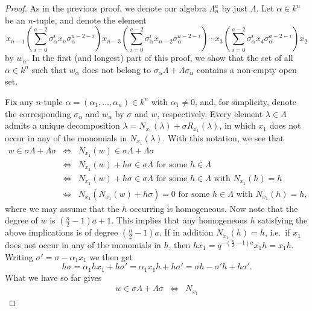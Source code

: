 \documentclass[a4paper]{amsart}
\theoremstyle{definition}
\theoremstyle{definition}
\theoremstyle{definition}
\theoremstyle{definition}
\theoremstyle{definition}
\theoremstyle{definition}
\theoremstyle{remark}
\theoremstyle{remark}
\theoremstyle{definition}
\theoremstyle{definition}
\begin{document}
\begin{proof}
As in the previous proof, we denote our algebra $\Lambda_n^a$ by
just $\Lambda$. Let $\alpha \in k^n$ be an $n$-tuple, and denote the
element
$$x_{n-1} \left ( \sum_{i=0}^{a-2} \sigma_{\alpha}^i x_n \sigma_{\alpha}^{a-2-i}
\right ) x_{n-3} \left ( \sum_{i=0}^{a-2} \sigma_{\alpha}^i x_{n-2}
\sigma_{\alpha}^{a-2-i} \right ) \cdots x_3 \left ( \sum_{i=0}^{a-2}
\sigma_{\alpha}^i x_4 \sigma_{\alpha}^{a-2-i} \right ) x_2$$ by
$w_{\alpha}$. In the first (and longest) part of this proof, we show
that the set of all $\alpha \in k^n$ such that $w_{\alpha}$ does not
belong to $\sigma_{\alpha} \Lambda + \Lambda \sigma_{\alpha}$
contains a non-empty open set.

Fix any $n$-tuple $\alpha = ( \alpha_1, \dots, \alpha_n ) \in k^n$
with $\alpha_1 \neq 0$, and, for simplicity, denote the
corresponding $\sigma_{\alpha}$ and $w_{\alpha}$ by $\sigma$ and
$w$, respectively. Every element $\lambda \in \Lambda$ admits a
unique decomposition $\lambda = N_{x_1}( \lambda ) + \sigma R_{x_1}
( \lambda )$, in which $x_1$ does not occur in any of the monomials
in $N_{x_1}( \lambda )$. With this notation, we see that
\begin{eqnarray*}
w \in \sigma \Lambda + \Lambda \sigma & \Leftrightarrow &
N_{x_1}(w) \in \sigma \Lambda + \Lambda \sigma \\
& \Leftrightarrow & N_{x_1}(w) + h \sigma \in \sigma \Lambda
\text{ for some } h \in \Lambda \\
& \Leftrightarrow & N_{x_1}(w) + h \sigma \in \sigma \Lambda
\text{ for some } h \in \Lambda \text{ with } N_{x_1}(h)=h \\
& \Leftrightarrow & N_{x_1} \left ( N_{x_1}(w) + h \sigma \right )
=0 \text{ for some } h \in \Lambda \text{ with } N_{x_1}(h)=h,
\end{eqnarray*}
where we may assume that the $h$ occurring is homogeneous. Now note
that the degree of $w$ is $\left ( \frac{n}{2} - 1 \right ) a+1$.
This implies that any homogeneous $h$ satisfying the above
implications is of degree $\left ( \frac{n}{2} - 1 \right ) a$. If
in addition $N_{x_1}(h)=h$, i.e.\ if $x_1$ does not occur in any of
the monomials in $h$, then $hx_1 = q^{- \left ( \frac{n}{2} - 1
\right ) a}x_1h = x_1h$. Writing $\sigma' = \sigma - \alpha_1 x_1$
we then get
$$h \sigma = \alpha_1hx_1 + h \sigma' = \alpha_1x_1 h +
h \sigma'  = \sigma h - \sigma' h + h \sigma'.$$ What we have so
far gives
\begin{eqnarray*}
w \in \sigma \Lambda + \Lambda \sigma & \Leftrightarrow & N_{x_1}

\end{eqnarray*}
\end{proof}
\end{document}
